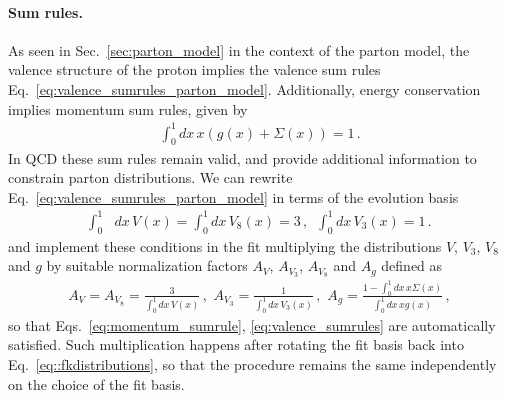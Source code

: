 %
\paragraph{Sum rules.} 
\label{sec:sumrules}
As seen in Sec.~\ref{sec:parton_model} in the context of the parton model, the valence structure
of the proton implies the valence sum rules Eq.~\eqref{eq:valence_sumrules_parton_model}.
Additionally, energy conservation implies momentum sum rules, given by
\begin{align}
    \label{eq:momentum_sumrule}
    \int_0^1 dx\, x\left(g\left(x\right) + \Sigma\left(x\right)\right) = 1\,. 
\end{align}
In QCD these sum rules remain valid, and provide additional information to constrain parton distributions.
We can rewrite Eq.~\eqref{eq:valence_sumrules_parton_model} in terms of the evolution basis
\begin{align}
    \label{eq:valence_sumrules}
    \int_0^1& dx\, V\left(x\right) = \int_0^1 dx\, V_8\left(x\right) = 3\,,   \,\,\,
    \int_0^1 dx\, V_3\left(x\right) = 1\,.
\end{align} 
and implement these conditions in the fit multiplying the distributions $V$, $V_3$, $V_8$ and $g$ by suitable normalization factors
$A_V$, $A_{V_3}$, $A_{V_8}$ and $A_g$ defined as
\begin{align}
    A_V = A_{V_8} = \frac{3}{\int_0^1 dx\, V\left(x\right)}\,,\,\,
    A_{V_3} = \frac{1}{\int_0^1 dx\, V_3\left(x\right)}\,,\,\,
    A_g = \frac{1 - \int_0^1 dx\, x \Sigma\left(x\right)}{\int_0^1 dx\, x g\left(x\right)}\,,
\end{align} 
so that Eqs.~\eqref{eq:momentum_sumrule}, \eqref{eq:valence_sumrules} are automatically
satisfied.
Such multiplication happens after rotating the fit basis back into Eq.~\eqref{eq::fkdistributions},
so that the procedure remains the same independently on the choice of the fit basis.

